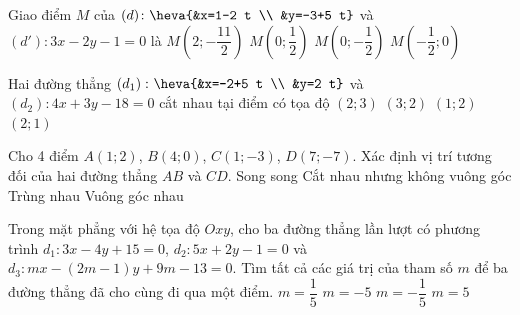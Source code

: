 \begin{ex}%
Giao điểm $M$ của $(d) \colon \heva{&x=1-2 t \\ &y=-3+5 t}$ và $\left(d'\right) \colon 3 x-2 y-1=0$ là
\choice
{$M\left(2 ;-\dfrac{11}{2}\right)$}
{$M\left(0 ; \dfrac{1}{2}\right)$}
{\True $M\left(0 ;-\dfrac{1}{2}\right)$}
{$M\left(-\dfrac{1}{2} ; 0\right)$}
\end{ex}

\begin{ex}%
Hai đường thẳng $\left(d_1\right) \colon \heva{&x=-2+5 t \\ &y=2 t}$ và $\left(d_2\right) \colon 4 x+3 y-18=0$ cắt nhau tại điểm có tọa độ
\choice
{\True $(2 ; 3)$}
{$(3 ; 2)$}
{$(1 ; 2)$}
{$(2 ; 1)$}
\end{ex}

\begin{ex}%
Cho 4 điểm $A(1 ; 2)$, $B(4 ; 0)$, $C(1 ;-3)$, $D(7 ;-7)$. Xác định vị trí tương đối của hai đường thẳng $A B$ và $C D$.
\choice
{\True Song song}
{Cắt nhau nhưng không vuông góc}
{Trùng nhau}
{Vuông góc nhau}
\end{ex}

\begin{ex}%
Trong mặt phẳng với hệ tọa độ $O x y$, cho ba đường thẳng lần lượt có phương trình $d_1 \colon 3 x-4 y+15=0$, $d_2 \colon 5 x+2 y-1=0$ và $d_3 \colon m x-(2 m-1) y+9 m-13=0$. Tìm tất cả các giá trị của tham số $m$ để ba đường thẳng đã cho cùng đi qua một điểm.
\choice
{$m=\dfrac{1}{5}$}
{$m=-5$}
{$m=-\dfrac{1}{5}$}
{\True $m=5$}
\end{ex}

